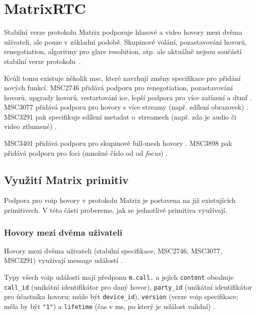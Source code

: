 \section{MatrixRTC}\label{matrixRTC}

Stabilní verze protokolu Matrix podporuje hlasové a video hovory mezi dvěma
uživateli, ale pouze v základní podobě. Skupinové volání, pozastavování hovorů,
renegotiation, algoritmy pro glare resolution, atp. ale aktuálně nejsou součástí
stabilní verze protokolu~\parencite{MatrixORG-Spec}.

Kvůli tomu existuje několik \gls{msc}, které navrhují změny specifikace pro
přidání nových funkcí. MSC2746 přidává podporu pro renegotiation, pozastavování
hovorů, upgrady hovorů, restartování \gls{ice}, lepší podpora pro více zařízení
a \gls{dtmf} \parencite{GitHub-MSC2746}. MSC3077 přidává podporu pro hovory s
více streamy (např. sdílení obrazovek) \parencite{GitHub-MSC3077}. MSC3291 pak
specifikuje sdílení metadat o~streamech (např. zda je audio či video ztlumené)
\parencite{GitHub-MSC3291}.

MSC3401 přidává podporu pro skupinové full-mesh hovory
\parencite{GitHub-MSC3401}. MSC3898 pak přidává podporu pro foci (množné číslo
od od \textit{focus}) \parencite{GitHub-MSC3898}.

\subsection{Využití Matrix primitiv}

Podpora pro \gls{voip} hovory v protokolu Matrix je postavena na již
existujících primitivech. V této části probereme, jak se jednotlivé primitiva
využívají.

\subsubsection{Hovory mezi dvěma uživateli}\label{dmCalls}

Hovory mezi dvěma uživateli (stabilní specifikace, MSC2746, MSC3077, MSC3291)
využívají message událostí
\parencite{MatrixORG-Spec,GitHub-MSC2746,GitHub-MSC3077,GitHub-MSC3291}.

Typy všech \gls{voip} události mají předponu \texttt{m.call.} a jejich
\texttt{content} obsahuje \texttt{call_id} (unikátní
identifikátor pro daný hovor), \texttt{party_id} (unikátní
identifikátor pro účastníka hovoru; může být \texttt{device_id}),
\texttt{version} (verze \gls{voip} specifikace; měla by být
\texttt{"1"}) a \texttt{lifetime} (čas v
\unit{\milli\second}, po který je událost validní)
\parencite{MatrixORG-Spec,GitHub-MSC2746}.

